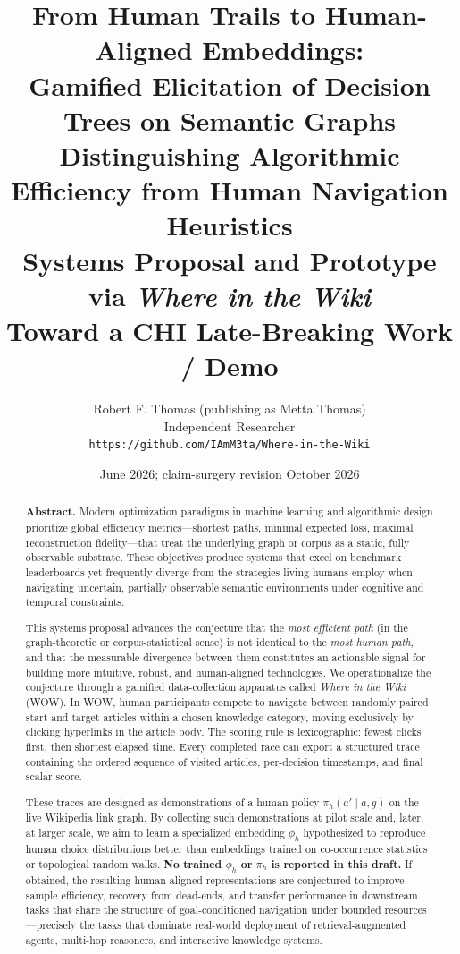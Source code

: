 \documentclass[11pt,a4paper]{report}
\title{\vspace{-1cm}\textbf{From Human Trails to Human-Aligned Embeddings:\\Gamified Elicitation of Decision Trees on Semantic Graphs}\\[0.6cm]
\large Distinguishing Algorithmic Efficiency from Human Navigation Heuristics\\[0.4cm]
\normalsize Systems Proposal and Prototype via \textit{Where in the Wiki}\\[0.3cm]
\normalsize Toward a CHI Late-Breaking Work / Demo}
\author{Robert F. Thomas (publishing as Metta Thomas)\\[0.2cm]
\small Independent Researcher\\[-0.1cm]
\small\texttt{https://github.com/IAmM3ta/Where-in-the-Wiki}}
\date{June 2026; claim-surgery revision October 2026}
\begin{document}
\maketitle

\begin{abstract}
\noindent\textbf{Abstract.} Modern optimization paradigms in machine learning and algorithmic design prioritize global efficiency metrics—shortest paths, minimal expected loss, maximal reconstruction fidelity—that treat the underlying graph or corpus as a static, fully observable substrate. These objectives produce systems that excel on benchmark leaderboards yet frequently diverge from the strategies living humans employ when navigating uncertain, partially observable semantic environments under cognitive and temporal constraints.  

This systems proposal advances the conjecture that the \textit{most efficient path} (in the graph-theoretic or corpus-statistical sense) is not identical to the \textit{most human path}, and that the measurable divergence between them constitutes an actionable signal for building more intuitive, robust, and human-aligned technologies. We operationalize the conjecture through a gamified data-collection apparatus called \textit{Where in the Wiki} (WOW). In WOW, human participants compete to navigate between randomly paired start and target articles within a chosen knowledge category, moving exclusively by clicking hyperlinks in the article body. The scoring rule is lexicographic: fewest clicks first, then shortest elapsed time. Every completed race can export a structured trace containing the ordered sequence of visited articles, per-decision timestamps, and final scalar score.  

These traces are designed as demonstrations of a human policy \(\pi_h(a'\mid a,g)\) on the live Wikipedia link graph. By collecting such demonstrations at pilot scale and, later, at larger scale, we aim to learn a specialized embedding \(\phi_h\) hypothesized to reproduce human choice distributions better than embeddings trained on co-occurrence statistics or topological random walks. \textbf{No trained \(\phi_h\) or \(\pi_h\) is reported in this draft.} If obtained, the resulting human-aligned representations are conjectured to improve sample efficiency, recovery from dead-ends, and transfer performance in downstream tasks that share the structure of goal-conditioned navigation under bounded resources—precisely the tasks that dominate real-world deployment of retrieval-augmented agents, multi-hop reasoners, and interactive knowledge systems.  


\end{abstract}
\end{document}
